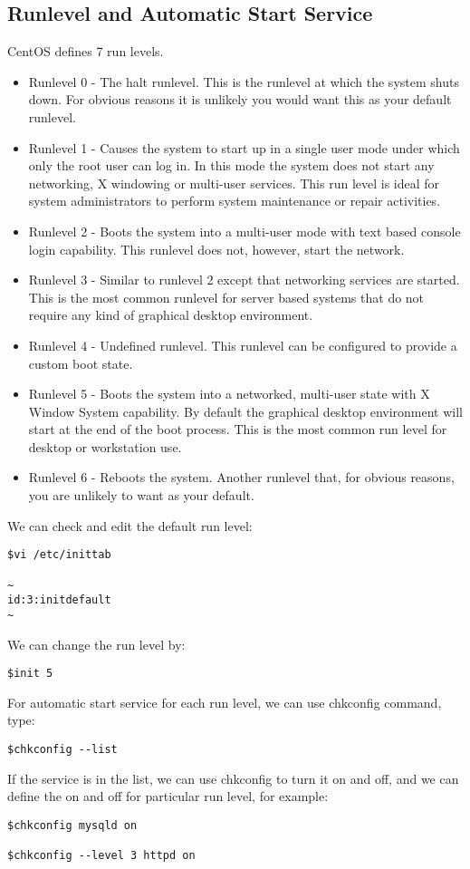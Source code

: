 \subsection{Runlevel and Automatic Start Service}
CentOS defines 7 run levels. 
\begin{itemize}
    \item
    Runlevel 0 - The halt runlevel. This is the runlevel at which the system shuts down. For obvious reasons it is unlikely you would want this as your default runlevel. 
    \item
    Runlevel 1 - Causes the system to start up in a single user mode under which only the root user can log in. In this mode the system does not start any networking, X windowing or multi-user services. This run level is ideal for system administrators to perform system maintenance or repair activities. 
    \item
    Runlevel 2 - Boots the system into a multi-user mode with text based console login capability. This runlevel does not, however, start the network. 
    \item
    Runlevel 3 - Similar to runlevel 2 except that networking services are started. This is the most common runlevel for server based systems that do not require any kind of graphical desktop environment. 
    \item
    Runlevel 4 - Undefined runlevel. This runlevel can be configured to provide a custom boot state. 
    \item
    Runlevel 5 - Boots the system into a networked, multi-user state with X Window System capability. By default the graphical desktop environment will start at the end of the boot process. This is the most common run level for desktop or workstation use. 
    \item
    Runlevel 6 - Reboots the system. Another runlevel that, for obvious reasons, you are unlikely to want as your default. 
\end{itemize}
We can check and edit the default run level:
\begin{lstlisting}
$vi /etc/inittab

~
id:3:initdefault
~
\end{lstlisting}
We can change the run level by:
\begin{lstlisting}
$init 5
\end{lstlisting}
For automatic start service for each run level, we can use chkconfig command, type:
\begin{lstlisting}
$chkconfig --list
\end{lstlisting}
If the service is in the list, we can use chkconfig to turn it on and off, and we can define the on and off for particular run level, for example:
\begin{lstlisting}
$chkconfig mysqld on

$chkconfig --level 3 httpd on
\end{lstlisting}

